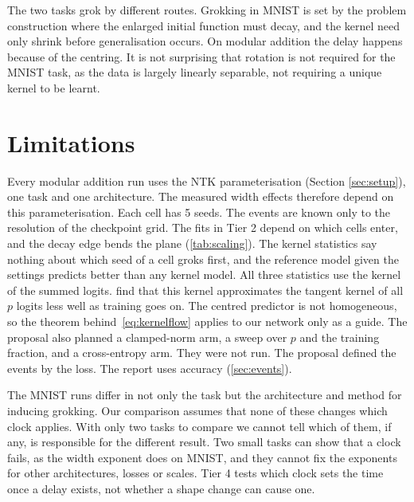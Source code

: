 \documentclass[a4paper,11pt]{article} %
\begin{document}
The two tasks grok by different routes. Grokking in MNIST
is set by the
\citet{liuOmnigrokGrokkingAlgorithmic2023} problem construction where the
enlarged initial function must decay, and the kernel need only shrink
before generalisation occurs. On
modular addition the delay happens because of the centring. It is not surprising that rotation is not required for the MNIST task, as the data is largely linearly separable, not requiring a unique kernel to be learnt. 

\section{Limitations}\label{sec:limitations}

Every modular addition run uses the NTK parameterisation (Section \ref{sec:setup}), one task and
one architecture. The measured width effects therefore depend on this
parameterisation. Each cell has 5 seeds. The events are known only to the
resolution of the checkpoint grid. The fits in Tier 2 depend on which cells
enter, and the decay edge bends the plane (\cref{tab:scaling}). The kernel
statistics say nothing about which seed of a cell groks first, and the
reference model given the settings predicts better than any kernel model. All
three statistics use the kernel of the summed logits.
\citet{mohamadiFastWellFoundedApproximation2022} find that this kernel
approximates the tangent kernel of all $p$ logits less well as training goes
on. The centred predictor is not homogeneous,
so the theorem behind~\eqref{eq:kernelflow} applies to our network only as a
guide. The proposal also planned a clamped-norm arm, a sweep over $p$ and the
training fraction, and a cross-entropy arm. They were not run. The proposal
defined the events by the loss. The report uses accuracy (\cref{sec:events}).

The MNIST runs differ in not only the task but the architecture and
method for inducing grokking. Our
comparison assumes that none of these changes
which clock applies. With only two tasks to compare we cannot tell
which of them,
if any, is responsible for the different result. Two small tasks can show that
a clock fails, as the width exponent does on MNIST, and they cannot fix the
exponents for other architectures, losses or scales. Tier 4 tests which clock
sets the time once a delay exists, not whether a shape change can cause one.
\end{document}
